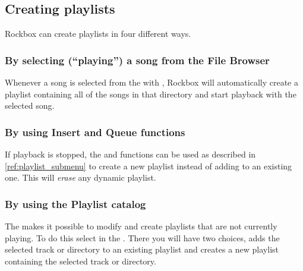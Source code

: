 \subsection{Creating playlists}

Rockbox can create playlists in four different ways.

\subsubsection{By selecting (``playing'') a song from the File Browser}
Whenever a song is selected from the  with
\ActionTreeEnter, Rockbox will automatically create a playlist containing
all of the songs in that directory and start playback with the selected
song.


\subsubsection{By using Insert and Queue functions}
If playback is stopped, the  and  functions
can be used as described in \ref{ref:playlist_submenu}
to create a new playlist instead of adding to an existing one.
This will \emph{erase} any dynamic playlist.

\subsubsection{\label{ref:playlist_catalog}By using the Playlist catalog}
The  makes it possible to modify and create playlists
that are not currently playing. To do this select 
in the . There you will have two choices,
 adds the selected track or directory to an existing
playlist and  creates a new playlist containing
the selected track or directory.


